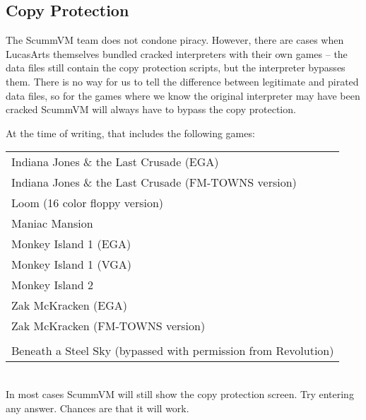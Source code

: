 \subsection{Copy Protection}

The ScummVM team does not condone piracy. However, there are cases when
LucasArts themselves bundled cracked interpreters with their own games --
the data files still contain the copy protection scripts, but the interpreter
bypasses them. There is no way for us to tell the difference between legitimate
and pirated data files, so for the games where we know the original interpreter
may have been cracked ScummVM will always have to bypass the copy protection.

At the time of writing, that includes the following games:

\begin{tabular}{l}
Indiana Jones \& the Last Crusade (EGA)\\
Indiana Jones \& the Last Crusade (FM-TOWNS version)\\
Loom (16 color floppy version)\\
Maniac Mansion\\
Monkey Island 1 (EGA)\\
Monkey Island 1 (VGA)\\
Monkey Island 2\\
Zak McKracken (EGA)\\
Zak McKracken (FM-TOWNS version)\\
\\
Beneath a Steel Sky (bypassed with permission from Revolution)
\end{tabular}\\

In most cases ScummVM will still show the copy protection screen. Try entering
any answer. Chances are that it will work.